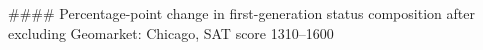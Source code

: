 #### Percentage-point change in first-generation status composition after excluding Geomarket: Chicago, SAT score 1310–1600
